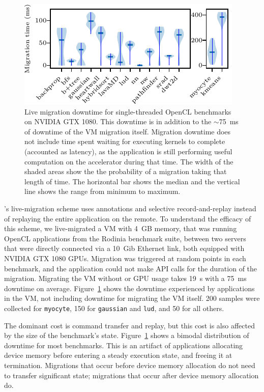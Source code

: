 \begin{figure}[!ht]
	\centering
	\includegraphics[width=0.7\linewidth]{ava/data/migration/time_plot.pdf}%
	\caption{Live migration downtime for single-threaded OpenCL benchmarks on NVIDIA GTX 1080. This downtime is in addition to the $\sim$\SI{75}{\milli\second} of downtime of the VM migration itself. Migration downtime does not include time spent waiting for executing kernels to complete (accounted as latency), as the application is still performing useful computation on the accelerator during that time. The width of the shaded areas show the the probability of a migration taking that length of time. The horizontal bar shows the median and the vertical line shows the range from minimum to maximum.}
	\label{fig:migration}
\end{figure}

\AvA's live-migration scheme uses annotations and selective record-and-replay instead of replaying the entire application on the remote.
To understand the efficacy of this scheme, we live-migrated a VM with 4~GB
memory, that was running OpenCL applications from the Rodinia benchmark suite,
between two servers that were directly connected via a 10~Gib Ethernet link,
both equipped with NVIDIA GTX 1080 GPUs. Migration was triggered at random
points in each benchmark, and the application could not make API calls for the
duration of the migration. Migrating the VM without \AvA or GPU usage takes
\SI{19}{\second} with a \SI{75}{\milli\second} downtime on average.
Figure~\ref{fig:migration} shows the downtime experienced by applications in
the VM, not including downtime for migrating the VM itself. 200 samples were
collected for \texttt{myocyte}, 150 for \texttt{gaussian} and \texttt{lud},
and 50 for all others.

The dominant cost is command transfer and replay, but this cost is also
affected by the size of the benchmark's state. Figure~\ref{fig:migration}
shows a bimodal distribution of downtime for most benchmarks. This is an
artifact of applications allocating device memory before entering a steady
execution state, and freeing it at termination. Migrations that occur before
device memory allocation do not need to transfer significant state; migrations
that occur after device memory allocation do.